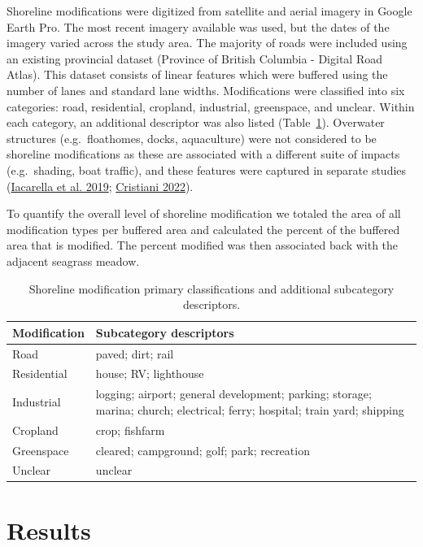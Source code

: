 \documentclass[12pt]{article}\usepackage[]{graphicx}\usepackage[]{color}
\begin{document}
Shoreline modifications were digitized from satellite and aerial imagery in Google Earth Pro. The most recent imagery available was used, but the dates of the imagery varied across the study area. The majority of roads were included using an existing provincial dataset (Province of British Columbia - Digital Road Atlas). This dataset consists of linear features which were buffered using the number of lanes and standard lane widths. Modifications were classified into six categories: road, residential, cropland, industrial, greenspace, and unclear. Within each category, an additional descriptor was also listed (Table~\ref{tab:modifications}). Overwater structures (e.g.~floathomes, docks, aquaculture) were not considered to be shoreline modifications as these are associated with a different suite of impacts (e.g.~shading, boat traffic), and these features were captured in separate studies (\protect\hyperlink{ref-Iacarella2019}{Iacarella et al. 2019}; \protect\hyperlink{ref-cristiani2022}{Cristiani 2022}).

To quantify the overall level of shoreline modification we totaled the area of all modification types per buffered area and calculated the percent of the buffered area that is modified. The percent modified was then associated back with the adjacent seagrass meadow.
\begin{table}[h]

\caption{\label{tab:modifications}Shoreline modification primary classifications and additional subcategory descriptors.}
\centering
\fontsize{9}{11}\selectfont
\begin{tabular}[t]{>{\centering\arraybackslash}m{10em}>{\raggedright\arraybackslash}m{30em}}
\toprule
\textbf{Modification} & \textbf{Subcategory descriptors}\\
\midrule
Road & paved; dirt; rail\\
\addlinespace
Residential & house; RV; lighthouse\\
\addlinespace
Industrial & logging; airport; general development; parking; storage; marina; church; electrical; ferry; hospital; train yard; shipping\\
\addlinespace
Cropland & crop; fishfarm\\
\addlinespace
Greenspace & cleared; campground; golf; park; recreation\\
\addlinespace
Unclear & unclear\\
\bottomrule
\end{tabular}
\end{table}
\hypertarget{results}{%
\section{Results}\label{results}}
\end{document}
